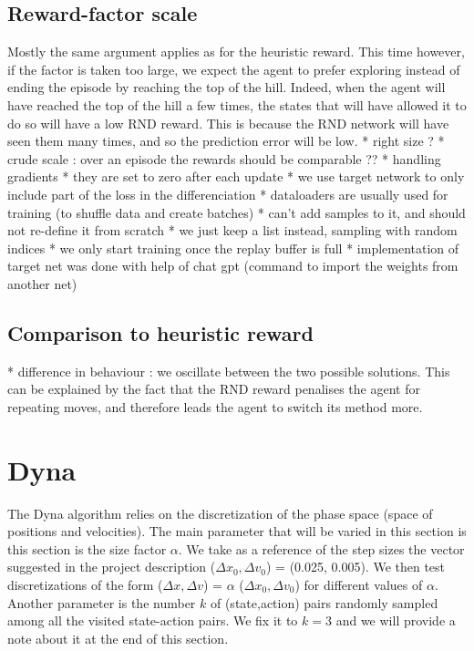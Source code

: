 \documentclass[a4paper, 12pt,oneside]{article}
\begin{document}
            \subsection{Reward-factor scale}
            Mostly the same argument applies as for the heuristic reward. This time however, if the factor is taken too large, we expect the agent to prefer exploring instead of ending the episode by reaching the top of the hill. Indeed, when the agent will have reached the top of the hill a few times, the states that will have allowed it to do so will have a low RND reward. This is because the RND network will have seen them many times, and so the prediction error will be low.
            * right size ?
            * crude scale : over an episode the rewards should be comparable ?? 
            * handling gradients 
            * they are set to zero after each update
            * we use target network to only include part of the loss in the differenciation 
          * dataloaders are usually used for training (to shuffle data and create batches)
            * can't add samples to it, and should not re-define it from scratch 
              * we just keep a list instead, sampling with random indices 
          * we only start training once the replay buffer is full 
          * implementation of target net was done with help of chat gpt (command to import the weights from another net)
        \subsection{Comparison to heuristic reward}
        * difference in behaviour : we oscillate between the two possible solutions. This can be explained by the fact that the RND reward penalises the agent for repeating moves, and therefore leads the agent to switch its method more. 
    
        \section{Dyna}
        The Dyna algorithm relies on the discretization of the phase space (space of positions and velocities).
        The main parameter that will be varied in this section is this section is the size factor $\alpha$. We take as a reference of the step sizes the vector suggested in the project description ($\Delta x_0, \Delta v_0$) = (0.025, 0.005). We then test discretizations of the form ($\Delta x, \Delta v$) = $\alpha$ ($\Delta x_0, \Delta v_0$) 
        for different values of $\alpha$. Another parameter is the number $k$ of (state,action) pairs randomly sampled among all the visited state-action pairs. We fix it to $k=3$ and we will provide a note about it at the end of this section. 
\end{document}
